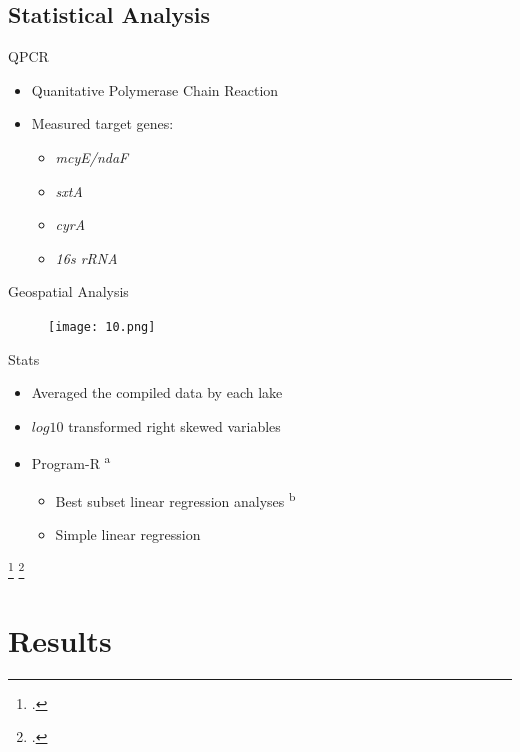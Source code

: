 \subsection{Statistical Analysis}
\begin{frame}{QPCR}
	\begin{itemize}
		\item Quanitative Polymerase Chain Reaction
		\item Measured target genes:
			\begin{itemize}
				\item \emph{mcyE/ndaF}
				\item \emph{sxtA}
				\item \emph{cyrA}
				\item \emph{16s rRNA}
			\end{itemize}
	\end{itemize}
\end{frame}
\begin{frame}{Geospatial Analysis}

	\begin{figure}
		\texttt{[image: 10.png]}
	\end{figure}
\end{frame}

\begin{frame}{Stats}
	\begin{itemize}
		\item Averaged the compiled data by each lake
		\item $log10$ transformed right skewed variables
		\item Program-R \textsuperscript{a}
			\begin{itemize}
				\item Best subset linear regression analyses \textsuperscript{b}
				\item Simple linear regression 
			\end{itemize}
	\end{itemize}
	\footcitetext{r_core_team_r:_2018}
	\footcitetext{miller_leaps:_2017}
\end{frame}
\section{Results}
